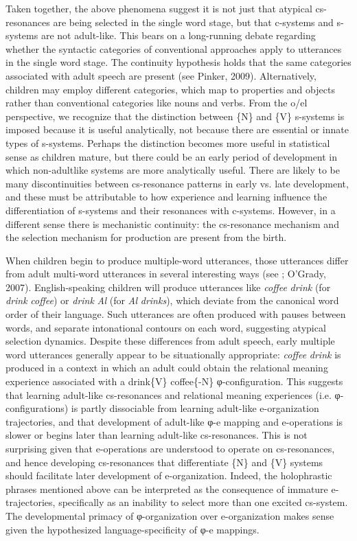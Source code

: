 Taken together, the above phenomena suggest it is not just that atypical cs-resonances are being selected in the single word stage, but that c-systems and s-systems are not adult-like. This bears on a long-running debate regarding whether the syntactic categories of conventional approaches apply to utterances in the single word stage. The continuity hypothesis holds that the same categories associated with adult speech are present (see Pinker, 2009). Alternatively, children may employ different categories, which map to properties and objects rather than conventional categories like nouns and verbs. From the o/el perspective, we recognize that the distinction between \{N\} and \{V\} s-systems is imposed because it is useful analytically, not because there are essential or innate types of s-systems. Perhaps the distinction becomes more useful in statistical sense as children mature, but there could be an early period of development in which non-adultlike systems are more analytically useful. There are likely to be many discontinuities between cs-resonance patterns in early vs. late development, and these must be attributable to how experience and learning influence the differentiation of s-systems and their resonances with c-systems. However, in a different sense there is mechanistic continuity: the cs-resonance mechanism and the selection mechanism for production are present from the birth.

When children begin to produce multiple-word utterances, those utterances differ from adult multi-word utterances in several interesting ways (see \citealt{Bloom1968}; O’Grady, 2007). English-speaking children will produce utterances like \textit{coffee} \textit{drink} (for \textit{drink} \textit{coffee}) or \textit{drink} \textit{Al} (for \textit{Al} \textit{drinks}), which deviate from the canonical word order of their language. Such utterances are often produced with pauses between words, and separate intonational contours on each word, suggesting atypical selection dynamics. Despite these differences from adult speech, early multiple word utterances generally appear to be situationally appropriate: \textit{coffee} \textit{drink} is produced in a context in which an adult could obtain the relational meaning experience associated with a {\textbar}drink\{V\} coffee\{-N\}{\textbar} φ{}-configuration. This suggests that learning adult-like cs-resonances and relational meaning experiences (i.e. φ{}-configurations) is partly dissociable from learning adult-like e-organization trajectories, and that development of adult-like φ{}-e mapping and e-operations is slower or begins later than learning adult-like cs-resonances. This is not surprising given that e-operations are understood to operate on cs-resonances, and hence developing cs-resonances that differentiate \{N\} and \{V\} systems should facilitate later development of e-organization. Indeed, the holophrastic phrases mentioned above can be interpreted as the consequence of immature e-trajectories, specifically as an inability to select more than one excited cs-system. The developmental primacy of φ{}-organization over e-organization makes sense given the hypothesized language-specificity of φ{}-e mappings.

